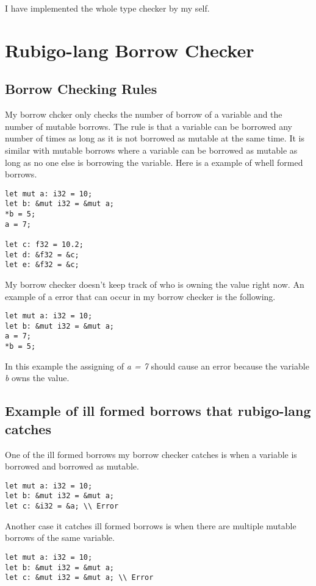 \documentclass[12pt]{article}
\begin{document}
		I have implemented the whole type checker by my self.



    \section{Rubigo-lang Borrow Checker}	
    	\subsection{Borrow Checking Rules}
 		My borrow chcker only checks the number of borrow of a variable and the number of mutable borrows. The rule is that a variable can be borrowed any number of times as long as it is not borrowed as mutable at the same time. It is similar with mutable borrows where a variable can be borrowed as mutable as long as no one else is borrowing the variable. Here is a example of whell formed borrows.
	\begin{verbatim}
let mut a: i32 = 10;
let b: &mut i32 = &mut a;
*b = 5;
a = 7;

let c: f32 = 10.2;
let d: &f32 = &c;
let e: &f32 = &c;
    	\end{verbatim}

		My borrow checker doesn't keep track of who is owning the value right now. An example of a error that can occur in my borrow checker is the following.

	\begin{verbatim}
let mut a: i32 = 10;
let b: &mut i32 = &mut a;
a = 7;
*b = 5;
    	\end{verbatim}

	In this example the assigning of \emph{a = 7} should cause an error because the variable \emph{b} owns the value.



	\subsection{Example of ill formed borrows that rubigo-lang catches}
		One of the ill formed borrows my borrow checker catches is when a variable is borrowed and borrowed as mutable.
	\begin{verbatim}
let mut a: i32 = 10;
let b: &mut i32 = &mut a;
let c: &i32 = &a; \\ Error
    	\end{verbatim}

	Another case it catches ill formed borrows is when there are multiple mutable borrows of the same variable.
	\begin{verbatim}
let mut a: i32 = 10;
let b: &mut i32 = &mut a;
let c: &mut i32 = &mut a; \\ Error
    	\end{verbatim}
\end{document}
